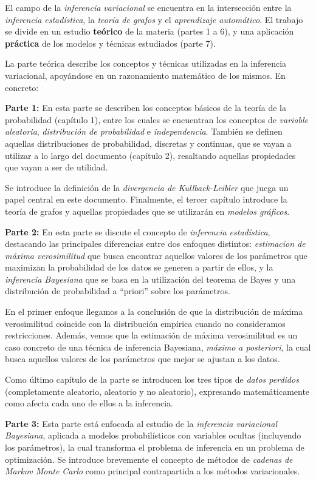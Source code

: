 
El campo de la \emph{inferencia variacional} se encuentra en la intersección entre la \emph{inferencia estadística}, la \emph{teoría de grafos} y el \emph{aprendizaje automático}. El trabajo se divide en un estudio \textbf{teórico} de la materia (partes 1 a 6), y una aplicación \textbf{práctica} de los modelos y técnicas estudiados (parte 7).

La parte teórica describe los conceptos y técnicas utilizadas en la inferencia variacional, apoyándose en un razonamiento matemático de los mismos. En concreto:

\textbf{Parte 1:} En esta parte se describen los conceptos básicos de la teoría de la probabilidad (capítulo 1), entre los cuales se encuentran los conceptos de \emph{variable aleatoria}, \emph{distribución de probabilidad} e \emph{independencia}. También se definen aquellas distribuciones de probabilidad, discretas y continuas, que se vayan a utilizar a lo largo del documento (capítulo 2), resaltando aquellas propiedades que vayan a ser de utilidad.

Se introduce la definición de la \emph{divergencia de Kullback-Leibler} que juega un papel central en este documento. Finalmente, el tercer capítulo introduce la teoría de grafos y aquellas propiedades que se utilizarán en \emph{modelos gráficos}.

\textbf{Parte 2:} En esta parte se discute el concepto de \emph{inferencia estadística}, destacando las principales diferencias entre dos enfoques distintos: \emph{estimacion de máxima verosimilitud} que busca encontrar aquellos valores de los parámetros que maximizan la probabilidad de los datos se generen a partir de ellos, y la \emph{inferencia Bayesiana} que se basa en la utilización del teorema de Bayes y una distribución de probabilidad a ``priori'' sobre los parámetros.

En el primer enfoque llegamos a la conclusión de que la distribución de máxima verosimilitud coincide con la distribución empírica cuando no consideramos restricciones. Además, vemos que la estimación de máxima verosimilitud es un caso concreto de una técnica de inferencia Bayesiana, \emph{máximo a posteriori}, la cual busca aquellos valores de los parámetros que mejor se ajustan a los datos.

Como último capítulo de la parte se introducen los tres tipos de \emph{datos perdidos} (completamente aleatorio, aleatorio y no aleatorio), expresando matemáticamente como afecta cada uno de ellos a la inferencia.

\textbf{Parte 3:} Esta parte está enfocada al estudio de la \emph{inferencia variacional Bayesiana}, aplicada a modelos probabilísticos con variables ocultas (incluyendo los parámetros), la cual transforma el problema de inferencia en un problema de optimización. Se introduce brevemente el concepto de métodos de \emph{cadenas de Markov Monte Carlo} como principal contrapartida a los métodos variacionales.

